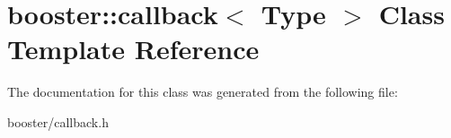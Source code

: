 \section{booster\+:\+:callback$<$ Type $>$ Class Template Reference}
\label{classbooster_1_1callback}


The documentation for this class was generated from the following file\+:\begin{DoxyCompactItemize}
\item 
booster/callback.\+h\end{DoxyCompactItemize}
